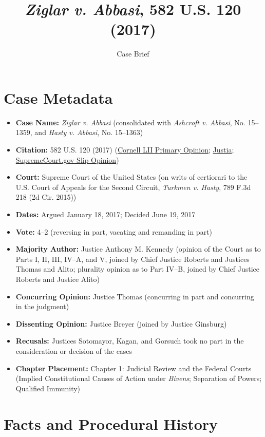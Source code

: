 \documentclass[12pt]{article}
\title{\textit{Ziglar v. Abbasi}, 582 U.S. 120 (2017)}
\author{Case Brief}
\date{}
\begin{document}
\maketitle

\section{Case Metadata}

\begin{itemize}
  \item \textbf{Case Name:} \textit{Ziglar v. Abbasi} (consolidated with \textit{Ashcroft v. Abbasi}, No. 15--1359, and \textit{Hasty v. Abbasi}, No. 15--1363)
  \item \textbf{Citation:} 582 U.S. 120 (2017) (\href{https://www.law.cornell.edu/supremecourt/text/15-1358}{Cornell LII Primary Opinion}; \href{https://supreme.justia.com/cases/federal/us/582/15-1358/}{Justia}; \href{https://www.supremecourt.gov/opinions/16pdf/15-1358_6khn.pdf}{SupremeCourt.gov Slip Opinion})
  \item \textbf{Court:} Supreme Court of the United States (on writs of certiorari to the U.S. Court of Appeals for the Second Circuit, \textit{Turkmen v. Hasty}, 789 F.3d 218 (2d Cir. 2015))
  \item \textbf{Dates:} Argued January 18, 2017; Decided June 19, 2017
  \item \textbf{Vote:} 4--2 (reversing in part, vacating and remanding in part)
  \item \textbf{Majority Author:} Justice Anthony M. Kennedy (opinion of the Court as to Parts I, II, III, IV--A, and V, joined by Chief Justice Roberts and Justices Thomas and Alito; plurality opinion as to Part IV--B, joined by Chief Justice Roberts and Justice Alito)
  \item \textbf{Concurring Opinion:} Justice Thomas (concurring in part and concurring in the judgment)
  \item \textbf{Dissenting Opinion:} Justice Breyer (joined by Justice Ginsburg)
  \item \textbf{Recusals:} Justices Sotomayor, Kagan, and Gorsuch took no part in the consideration or decision of the cases
  \item \textbf{Chapter Placement:} Chapter 1: Judicial Review and the Federal Courts (Implied Constitutional Causes of Action under \textit{Bivens}; Separation of Powers; Qualified Immunity)
\end{itemize}

\section{Facts and Procedural History}
\end{document}
